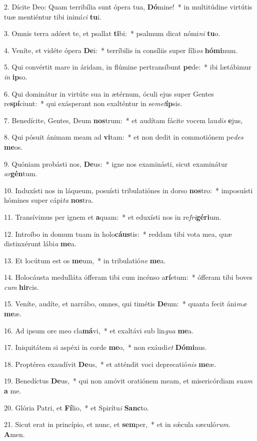 2. Dícite Deo: Quam terribília sunt ópera tua, \textbf{Dó}mine!~*  in multitúdine virtútis tuæ mentiéntur tibi inimí\textit{ci} \textbf{tu}i.\

3. Omnis terra adóret te, et psallat \textbf{ti}bi:~*  psalmum dicat nómi\textit{ni} \textbf{tu}o.\

4. Veníte, et vidéte ópera \textbf{De}i:~*  terríbilis in consíliis super fíli\textit{os} \textbf{hó}\textbf{mi}num.\

5. Qui convértit mare in áridam, in flúmine pertransíbunt \textbf{pe}de:~*  ibi lætábimur \textit{in} \textbf{ip}so.\

6. Qui dominátur in virtúte sua in ætérnum, óculi ejus super Gentes re\textbf{spí}ciunt:~*  qui exásperant non exalténtur in se\textit{met}\textbf{íp}sis.\

7. Benedícite, Gentes, Deum \textbf{nos}trum:~*  et audítam fácite vocem lau\textit{dis} \textbf{e}jus,\

8. Qui pósuit ánimam meam ad \textbf{vi}tam:~*  et non dedit in commotiónem pe\textit{des} \textbf{me}os.\

9. Quóniam probásti nos, \textbf{De}us:~*  igne nos examinásti, sicut examinátur \textit{ar}\textbf{gén}tum.\

10. Induxísti nos in láqueum, posuísti tribulatiónes in dorso \textbf{nos}tro:~*  imposuísti hómines super cápi\textit{ta} \textbf{nos}tra.\

11. Transívimus per ignem et \textbf{a}quam:~*  et eduxísti nos in re\textit{fri}\textbf{gé}\textbf{ri}um.\

12. Introíbo in domum tuam in holo\textbf{cáus}tis:~*  reddam tibi vota mea, quæ distinxérunt lábi\textit{a} \textbf{me}a.\

13. Et locútum est os \textbf{me}um,~*  in tribulatió\textit{ne} \textbf{me}a.\

14. Holocáusta medulláta ófferam tibi cum incénso a\textbf{rí}etum:~*  ófferam tibi boves \textit{cum} \textbf{hir}cis.\

15. Veníte, audíte, et narrábo, omnes, qui timétis \textbf{De}um:~*  quanta fecit áni\textit{mæ} \textbf{me}æ.\

16. Ad ipsum ore meo cla\textbf{má}vi,~*  et exaltávi sub lin\textit{gua} \textbf{me}a.\

17. Iniquitátem si aspéxi in corde \textbf{me}o,~*  non exáudi\textit{et} \textbf{Dó}\textbf{mi}nus.\

18. Proptérea exaudívit \textbf{De}us,~*  et atténdit voci deprecatió\textit{nis} \textbf{me}æ.\

19. Benedíctus \textbf{De}us,~*  qui non amóvit oratiónem meam, et misericórdiam su\textit{am} \textbf{a} me.\

20. Glória Patri, et \textbf{Fí}lio,~*  et Spirítu\textit{i} \textbf{Sanc}to.\

21. Sicut erat in princípio, et nunc, et \textbf{sem}per,~*  et in sǽcula sæculó\textit{rum}. \textbf{A}men.\

